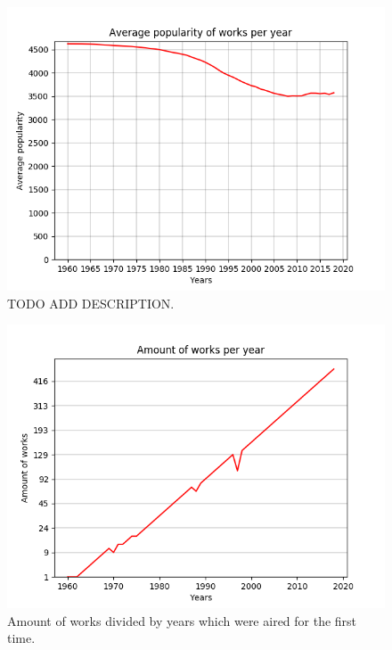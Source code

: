 \begin{figure}[!hbt]
\begin{center}
	\includegraphics[width=\columnwidth]{graphics/avgWorksPopularityPerYear_1960-2018.png}
	\caption{TODO ADD DESCRIPTION.}
	\label{fig:avgCaracteristicsOfWorks}
	\end{center}
\end{figure}

\begin{figure}[!hbt]
	\begin{center}
	\includegraphics[width=\columnwidth]{graphics/worksPerYear_1960-2018.png}
	\caption{Amount of works divided by years which were aired for the first time.}
	\label{fig:amountOfWorksPerYear}
	\end{center}
\end{figure}

